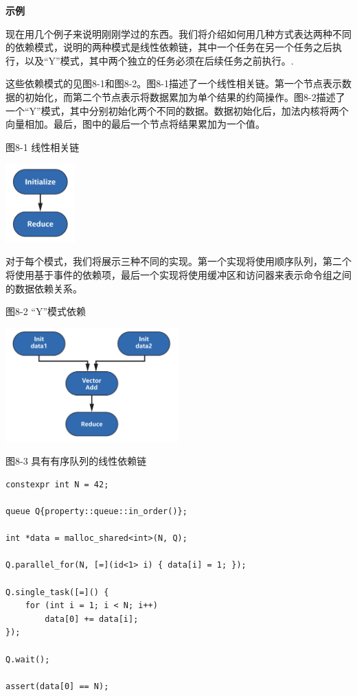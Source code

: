 \hspace*{\fill} \par %
\textbf{示例}

现在用几个例子来说明刚刚学过的东西。我们将介绍如何用几种方式表达两种不同的依赖模式，说明的两种模式是线性依赖链，其中一个任务在另一个任务之后执行，以及“Y”模式，其中两个独立的任务必须在后续任务之前执行。.\par

这些依赖模式的见图8-1和图8-2。图8-1描述了一个线性相关链。第一个节点表示数据的初始化，而第二个节点表示将数据累加为单个结果的约简操作。图8-2描述了一个“Y”模式，其中分别初始化两个不同的数据。数据初始化后，加法内核将两个向量相加。最后，图中的最后一个节点将结果累加为一个值。\par

\hspace*{\fill} \par %
图8-1 线性相关链
\begin{center}
	\includegraphics[width=0.2\textwidth]{content/chapter-8/images/2}
\end{center}

对于每个模式，我们将展示三种不同的实现。第一个实现将使用顺序队列，第二个将使用基于事件的依赖项，最后一个实现将使用缓冲区和访问器来表示命令组之间的数据依赖关系。\par

\hspace*{\fill} \par %
图8-2 “Y”模式依赖
\begin{center}
	\includegraphics[width=0.5\textwidth]{content/chapter-8/images/3}
\end{center}

\hspace*{\fill} \par %
图8-3 具有有序队列的线性依赖链
\begin{lstlisting}[caption={}]
constexpr int N = 42;

queue Q{property::queue::in_order()};

int *data = malloc_shared<int>(N, Q);

Q.parallel_for(N, [=](id<1> i) { data[i] = 1; });

Q.single_task([=]() {
	for (int i = 1; i < N; i++)
		data[0] += data[i];
});

Q.wait();

assert(data[0] == N);
\end{lstlisting}

